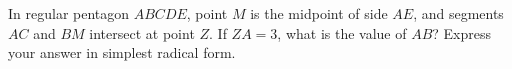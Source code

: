 In regular pentagon $ABCDE$, point $M$ is the midpoint of side $AE$, and segments $AC$ and $BM$ intersect at point $Z$. If $ZA=3$, what is the value of $AB$? Express your answer in simplest radical form.
